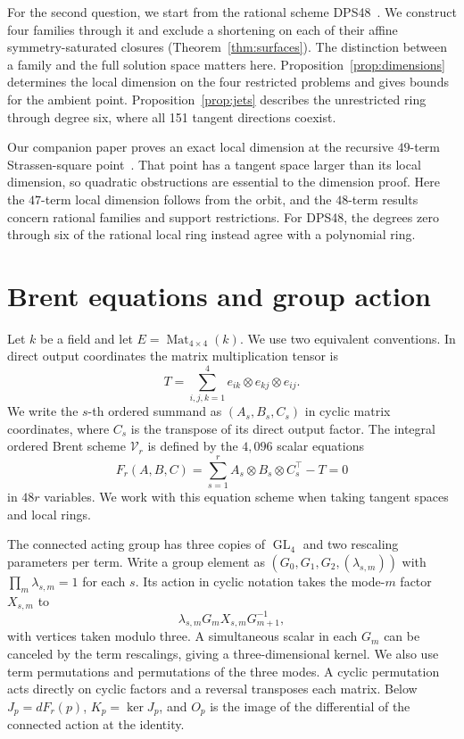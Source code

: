 \documentclass[11pt,reqno]{amsart}
\newcommand{\Brent}{\mathcal V}
\newcommand{\GL}{\operatorname{GL}}
\begin{document}
For the second question, we start from the rational scheme DPS48~\cite{dps}. We construct four families through it and exclude a shortening on each of their affine symmetry-saturated closures (Theorem~\ref{thm:surfaces}). The distinction between a family and the full solution space matters here. Proposition~\ref{prop:dimensions} determines the local dimension on the four restricted problems and gives bounds for the ambient point. Proposition~\ref{prop:jets} describes the unrestricted ring through degree six, where all 151 tangent directions coexist.

Our companion paper proves an exact local dimension at the recursive \(49\)-term Strassen-square point~\cite{strassensquare}. That point has a tangent space larger than its local dimension, so quadratic obstructions are essential to the dimension proof. Here the \(47\)-term local dimension follows from the orbit, and the \(48\)-term results concern rational families and support restrictions. For DPS48, the degrees zero through six of the rational local ring instead agree with a polynomial ring.

\section{Brent equations and group action}
Let \(k\) be a field and let \(E=\operatorname{Mat}_{4\times4}(k)\). We use two equivalent conventions. In direct output coordinates the matrix multiplication tensor is
\[
 T=\sum_{i,j,k=1}^4 e_{ik}\otimes e_{kj}\otimes e_{ij}.
\]
We write the \(s\)-th ordered summand as \((A_s,B_s,C_s)\) in cyclic matrix coordinates, where \(C_s\) is the transpose of its direct output factor. The integral ordered Brent scheme \(\Brent_r\) is defined by the \(4,096\) scalar equations
\begin{equation}\label{eq:brent}
 F_r(A,B,C)=\sum_{s=1}^r A_s\otimes B_s\otimes C_s^\top-T=0
\end{equation}
in \(48r\) variables. We work with this equation scheme when taking tangent spaces and local rings.

The connected acting group has three copies of \(\GL_4\) and two rescaling parameters per term. Write a group element as \((G_0,G_1,G_2,(\lambda_{s,m}))\) with \(\prod_m\lambda_{s,m}=1\) for each \(s\). Its action in cyclic notation takes the mode-\(m\) factor \(X_{s,m}\) to
\begin{equation}\label{eq:action}
 \lambda_{s,m}G_mX_{s,m}G_{m+1}^{-1},
\end{equation}
with vertices taken modulo three. A simultaneous scalar in each \(G_m\) can be canceled by the term rescalings, giving a three-dimensional kernel. We also use term permutations and permutations of the three modes. A cyclic permutation acts directly on cyclic factors and a reversal transposes each matrix. Below \(J_p=d F_r(p)\), \(K_p=\ker J_p\), and \(O_p\) is the image of the differential of the connected action at the identity.
\end{document}
